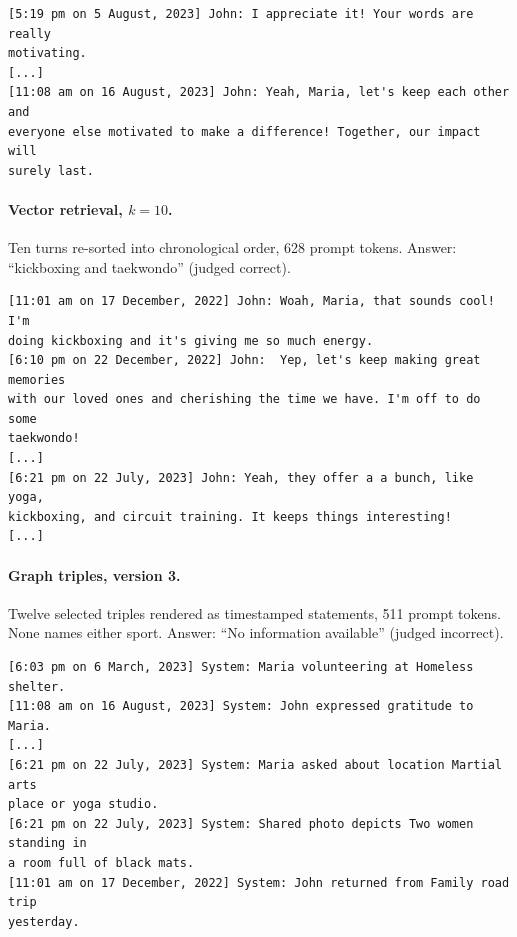 \begin{small}
\begin{verbatim}
[5:19 pm on 5 August, 2023] John: I appreciate it! Your words are really
motivating.
[...]
[11:08 am on 16 August, 2023] John: Yeah, Maria, let's keep each other and
everyone else motivated to make a difference! Together, our impact will
surely last.
\end{verbatim}
\end{small}

\paragraph{Vector retrieval, $k=10$.} Ten turns re-sorted into chronological order, 628 prompt
tokens. Answer: ``kickboxing and taekwondo'' (judged correct).

\begin{small}
\begin{verbatim}
[11:01 am on 17 December, 2022] John: Woah, Maria, that sounds cool! I'm
doing kickboxing and it's giving me so much energy.
[6:10 pm on 22 December, 2022] John:  Yep, let's keep making great memories
with our loved ones and cherishing the time we have. I'm off to do some
taekwondo!
[...]
[6:21 pm on 22 July, 2023] John: Yeah, they offer a a bunch, like yoga,
kickboxing, and circuit training. It keeps things interesting!
[...]
\end{verbatim}
\end{small}

\paragraph{Graph triples, version 3.} Twelve selected triples rendered as timestamped statements,
511 prompt tokens. None names either sport. Answer: ``No information available'' (judged
incorrect).

\begin{small}
\begin{verbatim}
[6:03 pm on 6 March, 2023] System: Maria volunteering at Homeless shelter.
[11:08 am on 16 August, 2023] System: John expressed gratitude to Maria.
[...]
[6:21 pm on 22 July, 2023] System: Maria asked about location Martial arts
place or yoga studio.
[6:21 pm on 22 July, 2023] System: Shared photo depicts Two women standing in
a room full of black mats.
[11:01 am on 17 December, 2022] System: John returned from Family road trip
yesterday.
\end{verbatim}
\end{small}

